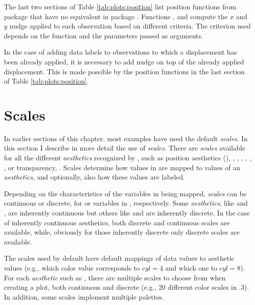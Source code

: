 \documentclass[krantz2]{krantz}\usepackage{knitr}
\begin{document}
The last two sections of Table \ref{tab:plots:position} list position functions from package \ggpp that have no equivalent in package . Functions ,  and  compute the $x$ and $y$ nudge applied to each observation based on different criteria. The criterion used depends on the function and the parameters passed as arguments.

In the case of adding data labels to observations to which a displacement has been already applied, it is necessary to add nudge on top of the already applied displacement. This is made possible by the position functions in the last section of Table \ref{tab:plots:position}.

\section{Scales}\label{sec:plot:scales}

In earlier sections of this chapter, most examples have used the default \emph{scales}. In this section I describe in more detail the use of \emph{scales}. There are \emph{scales} available for all the different \emph{aesthetics} recognized by , such as position aesthetics (), , , , , , ,  or transparency, . Scales determine how values in  are mapped to values of an \emph{aesthetics}, and optionally, also how these values are labeled.

Depending on the characteristics of the variables in  being mapped, \emph{scales} can be continuous or discrete, for  or  variables in , respectively. Some \emph{aesthetics}, like  and , are inherently continuous but others like  and  are inherently discrete. In the case of inherently continuous aesthetics, both discrete and continuous scales are available, while, obviously for those inherently discrete only discrete scales are available.

The scales used by default have default mappings of data values to aesthetic values (e.g., which color value corresponds to $cyl = 4$ and which one to $cyl = 8$). For each \emph{aesthetic} such as , there are multiple scales to choose from when creating a plot, both continuous and discrete (e.g., 20 different color scales in .3). In addition, some scales implement multiple palettes.
\end{document}
